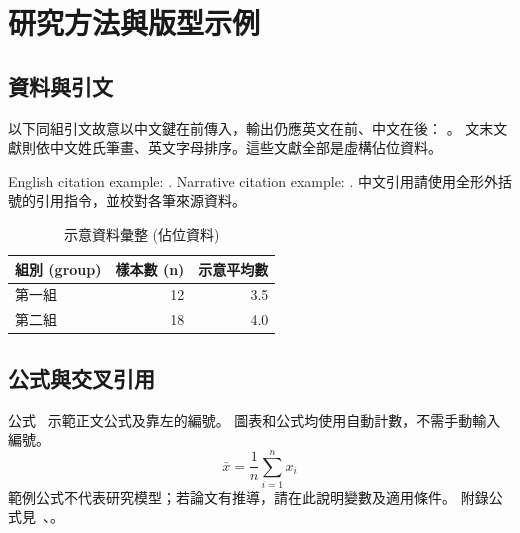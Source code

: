 \chapter{研究方法與版型示例}\label{chap:method}
\section{資料與引文}
以下同組引文故意以中文鍵在前傳入，輸出仍應英文在前、中文在後：
。
文末文獻則依中文姓氏筆畫、英文字母排序。這些文獻全部是虛構佔位資料。

English citation example: \parencite{brown2023,adams2022}.
Narrative citation example: \textcite{adams2022}.
中文引用請使用全形外括號的引用指令，並校對各筆來源資料。

\begin{table}[htbp]
  \caption{示意資料彙整 (佔位資料)}\label{tab:sample}
  \centering
  \begin{tabular*}{\linewidth}{@{\extracolsep{\fill}}lrr@{}}
    \hline
    組別 (group) & 樣本數 (n) & 示意平均數 \\
    \hline
    第一組 & 12 & 3.5 \\
    第二組 & 18 & 4.0 \\
    \hline
  \end{tabular*}
\end{table}

\section{公式與交叉引用}
公式~ 示範正文公式及靠左的編號。
圖表和公式均使用自動計數，不需手動輸入編號。
\begin{equation}\label{eq:mean}
  \bar{x}=\frac{1}{n}\sum_{i=1}^{n}x_i
\end{equation}
範例公式不代表研究模型；若論文有推導，請在此說明變數及適用條件。
附錄公式見~、。
